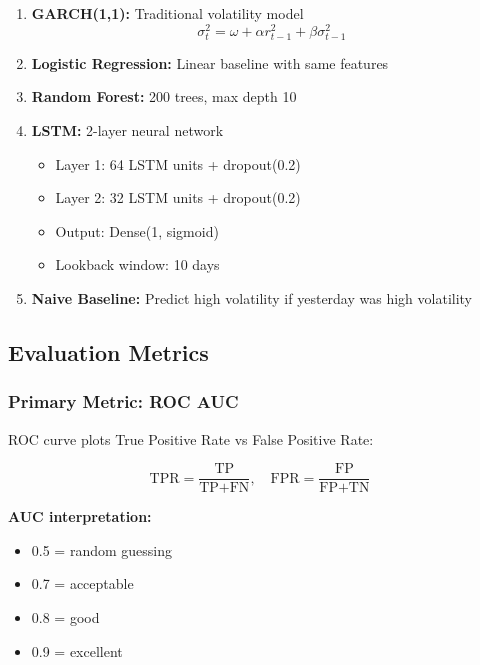 \documentclass[12pt,a4paper]{article}
\begin{document}
\begin{enumerate}
    \item \textbf{GARCH(1,1):} Traditional volatility model
    \begin{equation}
    \sigma_t^2 = \omega + \alpha r_{t-1}^2 + \beta \sigma_{t-1}^2
    \end{equation}
    
    \item \textbf{Logistic Regression:} Linear baseline with same features
    
    \item \textbf{Random Forest:} 200 trees, max depth 10
    
    \item \textbf{LSTM:} 2-layer neural network
    \begin{itemize}
        \item Layer 1: 64 LSTM units + dropout(0.2)
        \item Layer 2: 32 LSTM units + dropout(0.2)
        \item Output: Dense(1, sigmoid)
        \item Lookback window: 10 days
    \end{itemize}
    
    \item \textbf{Naive Baseline:} Predict high volatility if yesterday was high volatility
\end{enumerate}

\subsection{Evaluation Metrics}

\subsubsection{Primary Metric: ROC AUC}

ROC curve plots True Positive Rate vs False Positive Rate:

\begin{equation}
\text{TPR} = \frac{\text{TP}}{\text{TP} + \text{FN}}, \quad \text{FPR} = \frac{\text{FP}}{\text{FP} + \text{TN}}
\end{equation}

\textbf{AUC interpretation:}
\begin{itemize}
    \item 0.5 = random guessing
    \item 0.7 = acceptable
    \item 0.8 = good
    \item 0.9 = excellent
\end{itemize}
\end{document}
